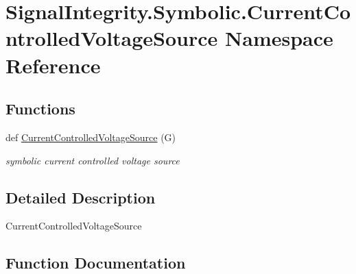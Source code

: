 \hypertarget{namespaceSignalIntegrity_1_1Symbolic_1_1CurrentControlledVoltageSource}{}\section{Signal\+Integrity.\+Symbolic.\+Current\+Controlled\+Voltage\+Source Namespace Reference}
\label{namespaceSignalIntegrity_1_1Symbolic_1_1CurrentControlledVoltageSource}
\subsection*{Functions}
\begin{DoxyCompactItemize}
\item 
def \hyperlink{namespaceSignalIntegrity_1_1Symbolic_1_1CurrentControlledVoltageSource_a51fbbc136ee62718b43714266a8331eb}{Current\+Controlled\+Voltage\+Source} (G)
\begin{DoxyCompactList}\small\item\em symbolic current controlled voltage source \end{DoxyCompactList}\end{DoxyCompactItemize}


\subsection{Detailed Description}
\begin{DoxyVerb}CurrentControlledVoltageSource\end{DoxyVerb}
 

\subsection{Function Documentation}
\mbox{\label{namespaceSignalIntegrity_1_1Symbolic_1_1CurrentControlledVoltageSource_a51fbbc136ee62718b43714266a8331eb}} 
